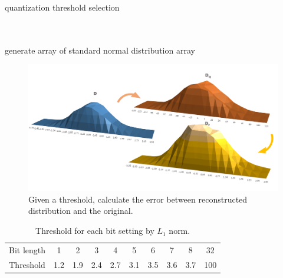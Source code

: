 \begin{algorithm}
    \SetAlgoLined
    \caption{quantization threshold selection}
    \label{alg:th_choice}
    \begin{algorithmic}[1]
         \\
        \ENSURE{$\tau$} \\
        generate  array of standard normal distribution array\\
        \ENDFOR
    \end{algorithmic}
\end{algorithm}
\begin{figure}
    \centering
    \includegraphics[width=0.8\linewidth]{inc/3_low_numeric_convolution_neural_network/figure/nor_dist.png}
    \caption{Given a threshold, calculate the error between reconstructed distribution and the original.}
    \label{fig:th_choice}
\end{figure}
\begin{table}[h]
    \caption{Threshold for each bit setting by $L_1$ norm.}
    \label{tab:threshold}
    \centering
    \footnotesize 
        \begin{tabular}{c|ccccccccc}
        \toprule
            Bit length &1 & 2 & 3 & 4 & 5 & 6 & 7 & 8 & 32 \\
            Threshold &1.2 & 1.9& 2.4& 2.7& 3.1& 3.5& 3.6& 3.7& 100 \\
 
        \bottomrule
        \end{tabular}
\end{table}


